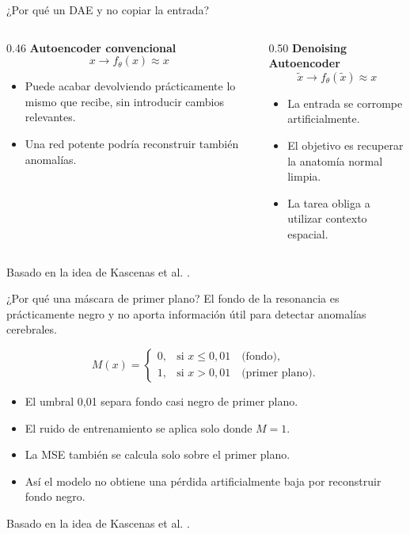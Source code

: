 \documentclass[10pt,aspectratio=169]{beamer}
\begin{document}
\begin{frame}{¿Por qué un DAE y no copiar la entrada?}
  \begin{columns}[T]
    \begin{column}{0.46\textwidth}
      \textbf{Autoencoder convencional}
      \[
        x\longrightarrow f_\theta(x)\approx x
      \]
      \begin{itemize}
        \item Puede acabar devolviendo prácticamente lo mismo que recibe, sin introducir cambios relevantes.
        \item Una red potente podría reconstruir también anomalías.
      \end{itemize}
    \end{column}
    \begin{column}{0.50\textwidth}
      \textbf{Denoising Autoencoder}
      \[
        \widetilde{x}\longrightarrow f_\theta(\widetilde{x})\approx x
      \]
      \begin{itemize}
        \item La entrada se corrompe artificialmente.
        \item El objetivo es recuperar la anatomía normal limpia.
        \item La tarea obliga a utilizar contexto espacial.
      \end{itemize}
    \end{column}
  \end{columns}

  \vspace{0.3cm}
  Basado en la idea de Kascenas et al. \cite{kascenas2022denoising}.
\end{frame}

\begin{frame}{¿Por qué una máscara de primer plano?}
  El fondo de la resonancia es prácticamente negro y no aporta información útil
  para detectar anomalías cerebrales.

  \[
    M(x)=\begin{cases}
      0, & \text{si } x\leq 0{,}01 \quad \text{(fondo)},\\
      1, & \text{si } x>0{,}01 \quad \text{(primer plano)}.
    \end{cases}
  \]

  \begin{itemize}
    \item El umbral 0,01 separa fondo casi negro de primer plano.
    \item El ruido de entrenamiento se aplica solo donde $M=1$.
    \item La MSE también se calcula solo sobre el primer plano.
    \item Así el modelo no obtiene una pérdida artificialmente baja por reconstruir fondo negro.
  \end{itemize}

  Basado en la idea de Kascenas et al. \cite{kascenas2022denoising}.
\end{frame}
\end{document}
